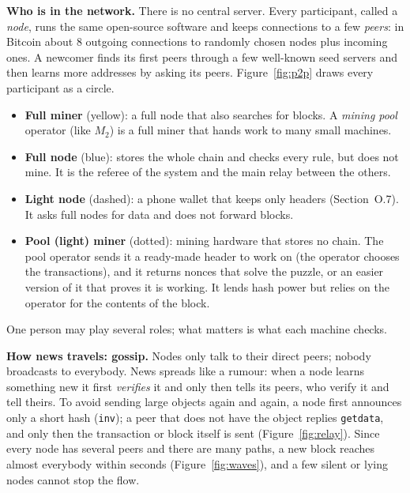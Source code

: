 \documentclass[11pt,a4paper]{article}
\theoremstyle{definition}
\theoremstyle{plain}
\theoremstyle{remark}
\begin{document}
\textbf{Who is in the network.} There is no central server. Every participant, called a \emph{node}, runs the same open-source software and keeps connections to a few \emph{peers}: in Bitcoin about $8$ outgoing connections to randomly chosen nodes plus incoming ones. A newcomer finds its first peers through a few well-known seed servers and then learns more addresses by asking its peers. Figure~\ref{fig:p2p} draws every participant as a circle.
\begin{itemize}[nosep,leftmargin=1.2em]
\item \textbf{Full miner} (yellow): a full node that also searches for blocks. A \emph{mining pool} operator (like $M_2$) is a full miner that hands work to many small machines.
\item \textbf{Full node} (blue): stores the whole chain and checks every rule, but does not mine. It is the referee of the system and the main relay between the others.
\item \textbf{Light node} (dashed): a phone wallet that keeps only headers (Section~O.7). It asks full nodes for data and does not forward blocks.
\item \textbf{Pool (light) miner} (dotted): mining hardware that stores no chain. The pool operator sends it a ready-made header to work on (the operator chooses the transactions), and it returns nonces that solve the puzzle, or an easier version of it that proves it is working. It lends hash power but relies on the operator for the contents of the block.
\end{itemize}
One person may play several roles; what matters is what each machine checks.

\textbf{How news travels: gossip.} Nodes only talk to their direct peers; nobody broadcasts to everybody. News spreads like a rumour: when a node learns something new it first \emph{verifies} it and only then tells its peers, who verify it and tell theirs. To avoid sending large objects again and again, a node first announces only a short hash (\texttt{inv}); a peer that does not have the object replies \texttt{getdata}, and only then the transaction or block itself is sent (Figure~\ref{fig:relay}). Since every node has several peers and there are many paths, a new block reaches almost everybody within seconds (Figure~\ref{fig:waves}), and a few silent or lying nodes cannot stop the flow.
\end{document}
